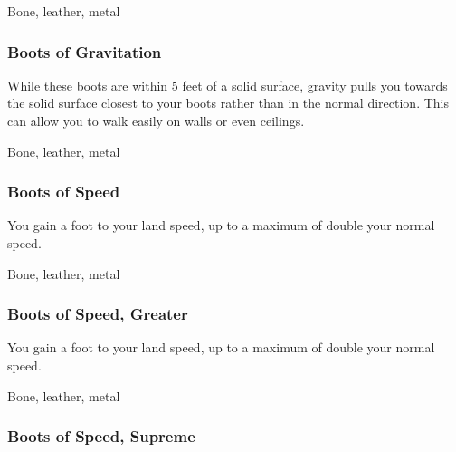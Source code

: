  Bone, leather, metal


\lowercase{\hypertarget{item:Boots of Gravitation}{}}\label{item:Boots of Gravitation}
\hypertarget{item:Boots of Gravitation}{\subsubsection{Boots of Gravitation\hfill{}}}

While these boots are within 5 feet of a solid surface, gravity pulls you towards the solid surface closest to your boots rather than in the normal direction.
This can allow you to walk easily on walls or even ceilings.



 Bone, leather, metal


\lowercase{\hypertarget{item:Boots of Speed}{}}\label{item:Boots of Speed}
\hypertarget{item:Boots of Speed}{\subsubsection{Boots of Speed\hfill{}}}

You gain a  foot  to your land speed, up to a maximum of double your normal speed.



 


 Bone, leather, metal


\lowercase{\hypertarget{item:Boots of Speed, Greater}{}}\label{item:Boots of Speed, Greater}
\hypertarget{item:Boots of Speed, Greater}{\subsubsection{Boots of Speed, Greater\hfill{}}}

You gain a  foot  to your land speed, up to a maximum of double your normal speed.



 


 Bone, leather, metal


\lowercase{\hypertarget{item:Boots of Speed, Supreme}{}}\label{item:Boots of Speed, Supreme}
\hypertarget{item:Boots of Speed, Supreme}{\subsubsection{Boots of Speed, Supreme\hfill{}}}

